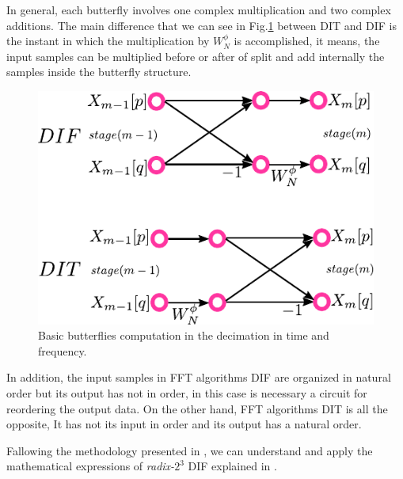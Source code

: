 \documentclass[journal,comsoc]{IEEEtran}
\begin{document}
In general, each butterfly involves one complex multiplication and two complex additions. The main difference that we can see in Fig.\ref{fig:difdit} between DIT and DIF is the instant in which the multiplication by $W_N^\phi$ is accomplished, it means, the input samples can be multiplied before or after of split and add internally the samples inside the butterfly structure.
\begin{figure}[h!]%
	\centering
	\includegraphics[width=0.65\linewidth]{Diagramas/miSeccionFiguras/DifDit.pdf}
	\caption{Basic butterflies computation in the decimation in time and frequency.}
	\label{fig:difdit}
\end{figure}

In addition, the input samples in FFT algorithms DIF are organized in natural order but its output has not in order, in this case is necessary a circuit for reordering the output data. On the other hand, FFT algorithms DIT is all the  opposite, It has not its input in order and its output has a natural order.

Fallowing the methodology presented in \cite{proakis_digital_nodate}, we can understand and apply the mathematical expressions of \textit{radix-}$2^3$ DIF explained in \cite{jia_efficient_nodate}. 
\end{document}
